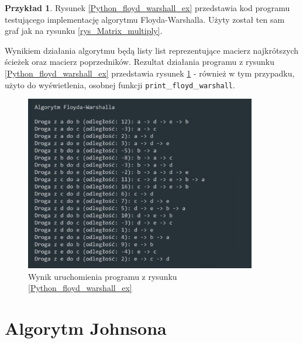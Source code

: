 \documentclass[12pt,a4paper]{book}
\theoremstyle{definition}
\newtheorem{ex}{Przykład}
\numberwithin{equation}{chapter}
\begin{document}
\begin{ex}
Rysunek \ref{Python_floyd_warshall_ex} przedstawia kod programu testującego implementację algorytmu Floyda-Warshalla. Użyty został ten sam graf jak na rysunku \ref{rys_Matrix_multiply}.



Wynikiem działania algorytmu będą listy list reprezentujące macierz najkrótszych ścieżek oraz macierz poprzedników. Rezultat działania programu z rysunku \ref{Python_floyd_warshall_ex} przedstawia rysunek \ref{rys_wynik_floyd_warshall} - również w tym przypadku, użyto do wyświetlenia, osobnej funkcji \texttt{print}\_\texttt{floyd}\_\texttt{warshall}.

\begin{figure}[H]
\centering
\includegraphics[width=0.9\textwidth]{images/floyd_warshall_example.pdf}
\caption{Wynik uruchomienia programu z rysunku \ref{Python_floyd_warshall_ex}}
\label{rys_wynik_floyd_warshall}
\end{figure}
\end{ex}

\section{Algorytm Johnsona}


\end{document}
